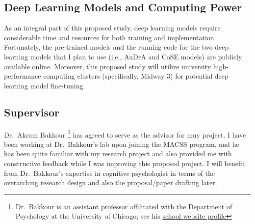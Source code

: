 \documentclass[../Proposal_Writing_Sample.tex]{subfiles}
\begin{document}
\subsection*{Deep Learning Models and Computing Power}
As an integral part of this proposed study, deep learning models require considerable time and resources for both training and implementation. Fortunately, the pre-trained models and the running code for the two deep learning models that I plan to use (i.e., AuDrA and CoSE models) are publicly available online. Moreover, this proposed study will utilize university high-performance computing clusters (specifically, Midway 3) for potential deep learning model fine-tuning.

\subsection*{Supervisor}
Dr.~Akram Bakkour \footnote{Dr.~Bakkour is an assistant professor affilitated with the Department of Psychology at the University of Chicago; see his \href{https://psychology.uchicago.edu/directory/Akram-Bakkour}{school website profile}} has agreed to serve as the advisor for muy project. I have been working at Dr.~Bakkour's lab upon joining the MACSS program, and he has been quite familiar with my research project and also provided me with constructive feedback while I was improving this proposed project. I will benefit from Dr.~Bakkour's expertise in cognitive psychologist in terms of the overarching research design and also the proposal/paper drafting later. 
\end{document}
